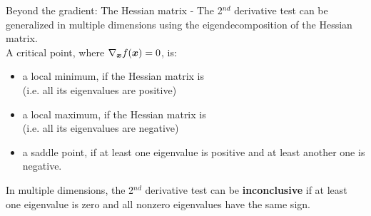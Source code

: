 \begin{frame}[t,allowframebreaks]{
    Beyond the gradient: The Hessian matrix -}
    The 2$^{nd}$ derivative test can be generalized in multiple dimensions
    using the \gls{eigendecomposition} 
    of the \gls{Hessian matrix}.\\
    \vspace{0.3cm}
    A \gls{critical point},
    where $\nabla_{\boldsymbol{x}} f(\boldsymbol{x})=0$, is:
    \begin{itemize}
        \item 
        a \gls{local minimum}, 
        if the \gls{Hessian matrix} is 
        \\ 
        (i.e. all its \glspl{eigenvalue} are positive)
        \item 
        a \gls{local maximum}, 
        if the \gls{Hessian matrix} is 
        \\ 
        (i.e. all its \glspl{eigenvalue} are negative)
        \item 
        a \gls{saddle point}, 
        if at least one \gls{eigenvalue} is positive 
        and at least another one is negative.
    \end{itemize}

    \vspace{0.3cm}

    In multiple dimensions, the 2$^{nd}$ derivative 
    test can be {\bf inconclusive} 
    if at least one \gls{eigenvalue} is zero and 
    all nonzero \glspl{eigenvalue} have the same sign.

    \framebreak



\end{frame}
